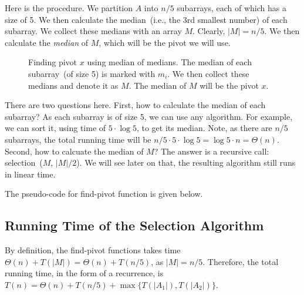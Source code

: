Here is the procedure. We partition $A$ into $n/5$ subarrays, each of which has a size of 5.
We then calculate the median~(i.e., the 3rd smallest number) of each subarray. We collect these medians
with an array $M$. Clearly, $|M| = n/5$. We then calculate the \emph{median} of $M$, which will be the pivot we will use.

\begin{figure}[h!]
\centering{}
\caption{Finding pivot $x$ using median of medians. The median of each subarray~(of size 5) is marked with $m_i$.
We then collect these medians and denote it as $M$. The median of $M$ will be the pivot $x$.}
\label{fig:median}
\end{figure}

There are two questions here. First, how to calculate the median of each subarray?
As each subarray is of size 5, we can use any algorithm. For example, we can sort it, using time of $5 \cdot \log 5$, to get its median.
Note, as there are $n/5$ subarrays, the total running time will be $n/5\cdot 5\cdot \log 5 = \log 5\cdot n = \Theta(n)$.
Second, how to calcuate the median of $M$? The answer is a recursive call: selection~($M$, $|M|/2$).
We will see later on that, the resulting algorithm still runs in linear time.

The pseudo-code for find-pivot function is given below.

\begin{minipage}{0.8\textwidth}
	\xxx
	\aab {\textcolor{blue}{if $|A| < 5$: find~(e.g., by sorting $A$) and return the median of $A$;}}\xxx
	\xxx
	\xxx
	\xxx
	\xxx
	\xxx
\end{minipage}

\subsection*{Running Time of the Selection Algorithm}

By definition, the find-pivot functions takes time $\Theta(n) + T(|M|) = \Theta(n) + T(n/5)$,
as $|M| = n/5$. %
Therefore, the total running time, in the form of a recurrence,
is $T(n) = \Theta(n) + T(n/5) + \max\{T(|A_1|), T(|A_2|)\}$.

